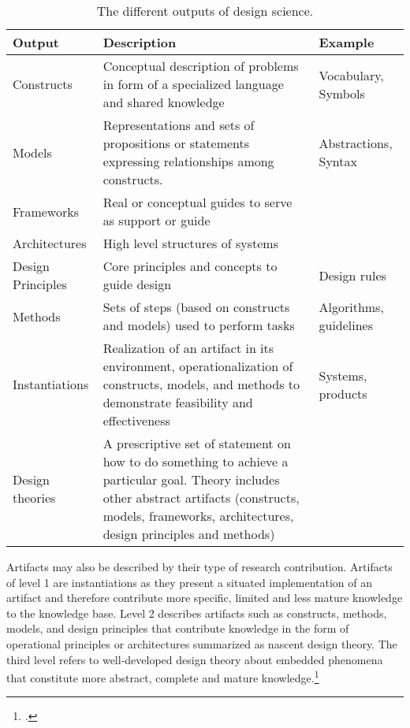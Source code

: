 \begin{table}
\setlength\extrarowheight{2pt} %
  \centering
  \begin{tabularx}{\textwidth}{|l|X|l|}
    \hline
        \textbf{Output} & \textbf{Description} & \textbf{Example}  \\ \hline\hline
        Constructs & Conceptual description of problems in form of a specialized language and shared knowledge & Vocabulary, Symbols \\
        Models & Representations and sets of propositions or statements expressing relationships among constructs. & Abstractions, Syntax \\
        Frameworks & Real or conceptual guides to serve as support or guide & \\
        Architectures & High level structures of systems & \\ 
        Design Principles & Core principles and concepts to guide design & Design rules \\
        Methods & Sets of steps (based on constructs and models) used to perform tasks & Algorithms, guidelines \\
        Instantiations & Realization of an artifact in its environment, operationalization of constructs, models, and methods to demonstrate feasibility and effectiveness & Systems, products \\
        Design theories & A prescriptive set of statement on how to do something to achieve a particular goal. Theory includes other abstract artifacts (constructs, models, frameworks, architectures, design principles and methods) & \\ \hline
    \end{tabularx}
    \caption[The different outputs of design science.]{The different outputs of design science.\protect\footnotemark }
    \label{tab:Artifacts}
\end{table}

Artifacts may also be described by their type of research contribution. Artifacts of level 1 are instantiations as they present a situated implementation of an artifact and therefore contribute more specific, limited and less mature knowledge to the knowledge base. Level 2 describes artifacts such as constructs, methods, models, and design principles that contribute knowledge in the form of operational principles or architectures summarized as nascent design theory. The third level refers to well-developed design theory about embedded phenomena that constitute more abstract, complete and mature knowledge.\footcite[Cf.][p.340]{GregorPositioningpresentingdesign2013} \label{topic:levels} 

